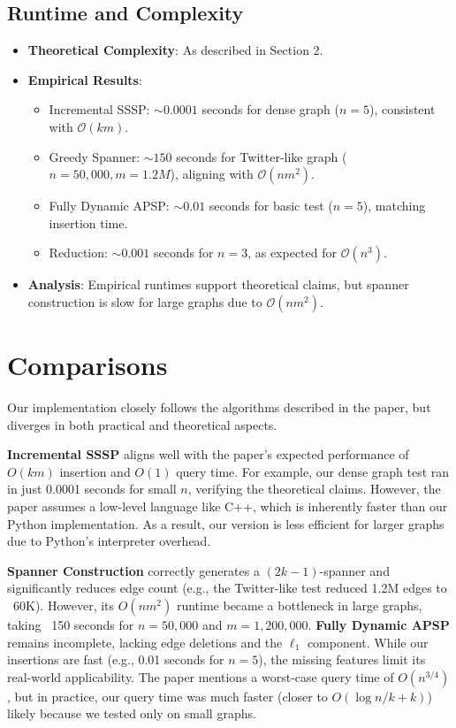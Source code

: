 \documentclass[11pt]{article}
\begin{document}
\subsection{Runtime and Complexity}
\begin{itemize}
    \item \textbf{Theoretical Complexity}: As described in Section 2.
    \item \textbf{Empirical Results}:
    \begin{itemize}
        \item Incremental SSSP: $\sim 0.0001$ seconds for dense graph ($n=5$), consistent with $\mathcal{O}(km)$.
        \item Greedy Spanner: $\sim 150$ seconds for Twitter-like graph ($n=50,000, m=1.2M$), aligning with $\mathcal{O}(nm^2)$.
        \item Fully Dynamic APSP: $\sim 0.01$ seconds for basic test ($n=5$), matching insertion time.
        \item Reduction: $\sim 0.001$ seconds for $n=3$, as expected for $\mathcal{O}(n^3)$.
    \end{itemize}
    \item \textbf{Analysis}: Empirical runtimes support theoretical claims, but spanner construction is slow for large graphs due to $\mathcal{O}(nm^2)$.
\end{itemize}

\section{Comparisons}
Our implementation closely follows the algorithms described in the paper, but diverges in both practical and theoretical aspects.

\textbf{Incremental SSSP} aligns well with the paper's expected performance of $O(km)$ insertion and $O(1)$ query time. For example, our dense graph test ran in just 0.0001 seconds for small $n$, verifying the theoretical claims. However, the paper assumes a low-level language like C++, which is inherently faster than our Python implementation. As a result, our version is less efficient for larger graphs due to Python's interpreter overhead.

\textbf{Spanner Construction} correctly generates a $(2k{-}1)$-spanner and significantly reduces edge count (e.g., the Twitter-like test reduced 1.2M edges to ~60K). However, its $O(nm^2)$ runtime became a bottleneck in large graphs, taking ~150 seconds for $n{=}50{,}000$ and $m{=}1{,}200{,}000$.
\textbf{Fully Dynamic APSP} remains incomplete, lacking edge deletions and the $\ell_1$ component. While our insertions are fast (e.g., 0.01 seconds for $n{=}5$), the missing features limit its real-world applicability. The paper mentions a worst-case query time of $O(n^{3/4})$, but in practice, our query time was much faster (closer to $O(\log n / k + k)$) likely because we tested only on small graphs.
\end{document}
